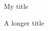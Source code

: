 \documentclass{article}
\begin{document}
\begin{mybox}{My title}
\lipsum[2]
\end{mybox}

\begin{mybox}{A longer title}
\lipsum[2]
\end{mybox}
\end{document}
